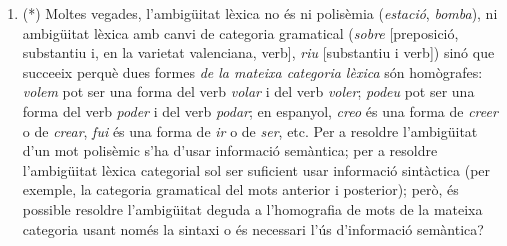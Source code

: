 \begin{enumerate}


\item (*) Moltes vegades, l'ambigüitat lèxica no és ni polisèmia
  (\emph{estació}, \emph{bomba}), ni ambigüitat lèxica amb canvi de
  categoria gramatical (\emph{sobre} [preposició, substantiu i, en la
  varietat valenciana, verb], \emph{riu} [substantiu i verb]) sinó que
  succeeix perquè dues formes \emph{de la mateixa categoria lèxica}
  són homògrafes: \emph{volem} pot ser una forma del verb \emph{volar}
  i del verb \emph{voler}; \emph{podeu} pot ser una forma del verb
  \emph{poder} i del verb \emph{podar}; en espanyol, \emph{creo} és
  una forma de \emph{creer} o de \emph{crear}, \emph{fui} és una forma
  de \emph{ir} o de \emph{ser}, etc. Per a resoldre l'ambigüitat d'un
  mot polisèmic s'ha d'usar informació semàntica; per a resoldre
  l'ambigüitat lèxica categorial sol ser suficient usar informació
  sintàctica (per exemple, la categoria gramatical del mots anterior i
  posterior); però, és possible resoldre l'ambigüitat deguda a
  l'homografia de mots de la mateixa categoria usant només la sintaxi
  o és necessari l'ús d'informació semàntica?


\end{enumerate}
